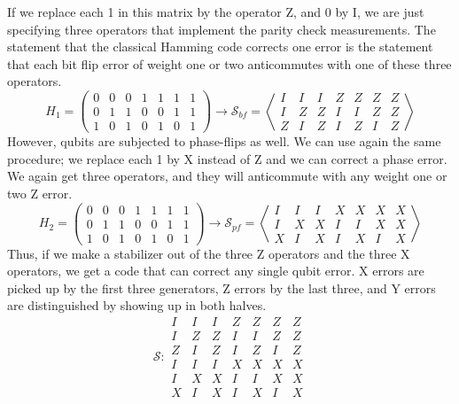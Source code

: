 If we replace each 1 in this matrix by the operator Z, and 0 by I, we are just specifying three operators that implement the parity check measurements. The statement that the classical Hamming code corrects one error is the statement that each bit flip error of weight one or two anticommutes with one of these three operators.
\begin{equation*}
    H_1=\left(\begin{array}{ccccccc}
         0&0&0&1&1&1&1 \\
         0&1&1&0&0&1&1 \\
         1&0&1&0&1&0&1 
    \end{array}\right) \to \mathcal{S}_{bf}=\left\langle\begin{array}{ccccccc}
         I&I&I&Z&Z&Z&Z  \\
         I&Z&Z&I&I&Z&Z \\
         Z&I&Z&I&Z&I&Z 
    \end{array}\right\rangle
\end{equation*}
However, qubits are subjected to phase-flips as well. We can use again the same procedure; we replace each 1 by X instead of Z and we can correct a phase error. We again get three operators, and they will anticommute with any weight one or two Z error.
\begin{equation*}
    H_2=\left(\begin{array}{ccccccc}
         0&0&0&1&1&1&1 \\
         0&1&1&0&0&1&1 \\
         1&0&1&0&1&0&1
    \end{array}\right) \to \mathcal{S}_{pf}=\left\langle\begin{array}{ccccccc}
         I&I&I&X&X&X&X  \\
         I&X&X&I&I&X&X \\
         X&I&X&I&X&I&X 
    \end{array}\right\rangle
\end{equation*}
Thus, if we make a stabilizer out of the three Z operators and the three X operators, we get a code that can correct any single qubit error. X errors are picked up by the first three generators, Z errors by the last three, and Y errors are distinguished by showing up in both halves. 
\begin{equation}
    \mathcal{S} : \begin{array}{ccccccc}
         I&I&I&Z&Z&Z&Z  \\
         I&Z&Z&I&I&Z&Z \\
         Z&I&Z&I&Z&I&Z \\
         I&I&I&X&X&X&X  \\
         I&X&X&I&I&X&X \\
         X&I&X&I&X&I&X 
         \end{array}
         \label{eq:stabSteane}
\end{equation}
